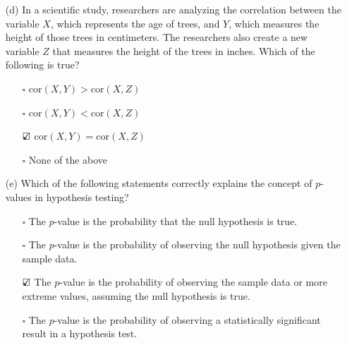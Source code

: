 \documentclass{./../../../Latex/tests}
\begin{document}
\begin{enumerate}
\newpage
\item[(d)] In a scientific study, researchers are analyzing the correlation between the variable \( X \), which represents the age of trees, and \( Y \), which measures the height of those trees in centimeters. The researchers also create a new variable \( Z \) that measures the height of the trees in inches. Which of the following is true?

\begin{itemize}
\item[$\square$] \( \text{cor}(X, Y) >\text{cor}(X, Z) \)
\item[$\square$] \( \text{cor}(X, Y) < \text{cor}(X, Z) \)
\item[$\text{\rlap{$\checkmark$}}\square$] \( \text{cor}(X, Y) = \text{cor}(X, Z) \)
\item[$\square$] None of the above \\
\end{itemize}


\item[(e)] Which of the following statements correctly explains the concept of $p$-values in hypothesis testing?
\begin{enumerate}
\item[$\square$] The $p$-value is the probability that the null hypothesis is true.
\item[$\square$] The $p$-value is the probability of observing the null hypothesis given the sample data.
\item[$\text{\rlap{$\checkmark$}}\square$] The $p$-value is the probability of observing the sample data or more extreme values, assuming the null hypothesis is true.
\item[$\square$] The $p$-value is the probability of observing a statistically significant result in a hypothesis test.
\end{enumerate}
\end{enumerate}
\end{document}
